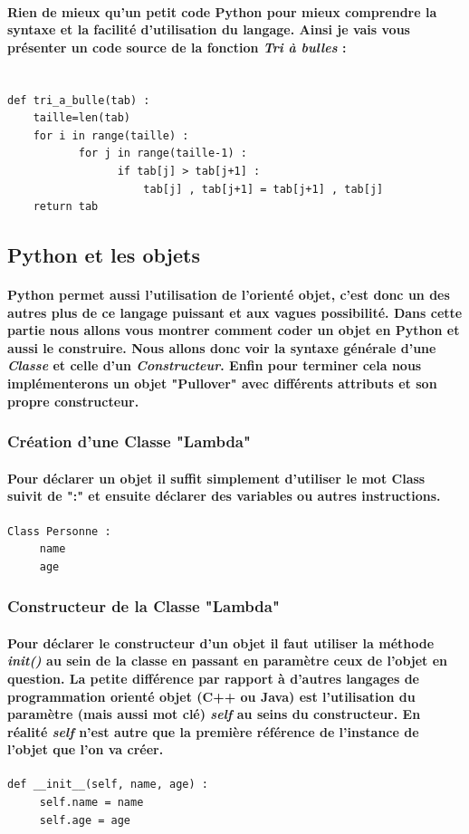 \documentclass[a4paper, 12pt, twoside]{article}
\begin{document}
\paragraph{Rien de mieux qu'un petit code Python pour mieux comprendre la syntaxe et la facilité d'utilisation du langage. Ainsi je vais vous présenter un code source de la fonction \textit{Tri à bulles} :}

\begin{verbatim}

def tri_a_bulle(tab) :
    taille=len(tab)
    for i in range(taille) :
           for j in range(taille-1) : 
                 if tab[j] > tab[j+1] :
                     tab[j] , tab[j+1] = tab[j+1] , tab[j]
    return tab
\end{verbatim}

\subsection{Python et les objets}
\paragraph{Python permet aussi l'utilisation de l'orienté objet, c'est donc un des autres plus de ce langage puissant et aux vagues possibilité. Dans cette partie nous allons vous montrer comment coder un objet en Python et aussi le construire. Nous allons donc voir la syntaxe générale d'une  \textit{Classe} et celle d'un \textit{Constructeur}. Enfin pour terminer cela nous implémenterons un objet "Pullover" avec différents attributs et son propre constructeur.}

\subsubsection{Création d'une Classe "Lambda" }
\paragraph{Pour déclarer un objet il suffit simplement d'utiliser le mot Class suivit de ":" et ensuite déclarer des variables ou autres instructions.}
\begin{verbatim}
Class Personne : 
     name
     age
\end{verbatim}
\subsubsection{Constructeur de la Classe "Lambda"}
\paragraph{Pour déclarer le constructeur d'un objet il faut utiliser la méthode \textit{init()} au sein de la classe en passant en paramètre ceux de l'objet en question. La petite différence par rapport à d'autres langages de programmation orienté objet (C++ ou Java) est l'utilisation du paramètre (mais aussi mot clé) \textit{self} au seins du constructeur. En réalité \textit{self} n'est autre que la première référence de l'instance de l'objet que l'on va créer. } 
\begin{verbatim}
def __init__(self, name, age) :
     self.name = name
     self.age = age
\end{verbatim}
\end{document}
